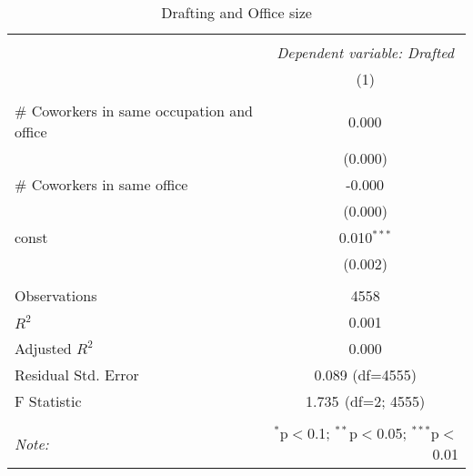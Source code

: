 \begin{table}[!htbp] \centering
\caption{Drafting and Office size}
\begin{tabular}{@{\extracolsep{5pt}}lc}
\\[-1.8ex]\hline
\hline \\[-1.8ex]
& \multicolumn{1}{c}{\textit{Dependent variable: Drafted}} \
\cr \cline{2-2}
\\[-1.8ex] & (1) \\
\hline \\[-1.8ex]
 \# Coworkers in same occupation and office & 0.000$^{}$ \\
& (0.000) \\
 \# Coworkers in same office & -0.000$^{}$ \\
& (0.000) \\
 const & 0.010$^{***}$ \\
& (0.002) \\
\hline \\[-1.8ex]
 Observations & 4558 \\
 $R^2$ & 0.001 \\
 Adjusted $R^2$ & 0.000 \\
 Residual Std. Error & 0.089 (df=4555) \\
 F Statistic & 1.735$^{}$ (df=2; 4555) \\
\hline
\hline \\[-1.8ex]
\textit{Note:} & \multicolumn{1}{r}{$^{*}$p$<$0.1; $^{**}$p$<$0.05; $^{***}$p$<$0.01} \\
\end{tabular}
\end{table}